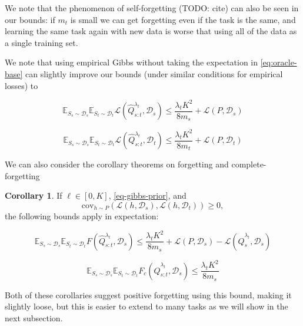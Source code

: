 \documentclass[letterpaper]{article}
\theoremstyle{definition}
\newtheorem{corollary}{Corollary}
\begin{document}
We note that the phenomenon of self-forgetting (TODO: cite) can also be seen in our bounds: if $m_t$ is small we can get forgetting even if the task is the same, and learning the same task again with new data is worse that using all of the data as a single training set.

We note that using empirical Gibbs without taking the expectation in \eqref{eq:oracle-base} can slightly improve our bounds (under similar conditions for empirical losses) to 

\begin{equation} 
\mathbb{E}_{S_s\sim \mathcal{D}_s}\mathbb{E}_{S_t\sim \mathcal{D}_t}\mathcal{L}( \hat{Q}^{\lambda_t}_{s:t},\mathcal{D}_s)\leq \frac{\lambda_t K^2}{8m_s}+\mathcal{L}(P,\mathcal{D}_s)
\end{equation}

\begin{equation} 
\mathbb{E}_{S_s\sim \mathcal{D}_s}\mathbb{E}_{S_t\sim \mathcal{D}_t}\mathcal{L}( \hat{Q}^{\lambda_t}_{s:t},\mathcal{D}_t)\leq \frac{\lambda_t K^2}{8m_t}+\mathcal{L}(P,\mathcal{D}_t) 
\end{equation}

We can also consider the corollary theorems on forgetting and complete-forgetting

\begin{corollary}
If $\ell\in[0,K]$, \eqref{eq-gibbs-prior}, and $$\mathrm{cov}_{h\sim P}\left (\mathcal{L}(h,\mathcal{D}_s), \mathcal{L}(h,\mathcal{D}_t)\right )\geq 0,$$ the following bounds apply in expectation:    

\begin{equation} 
\mathbb{E}_{S_s\sim \mathcal{D}_s}\mathbb{E}_{S_t\sim \mathcal{D}_t}F( \hat{Q}^{\lambda_t}_{s:t},\mathcal{D}_s)\leq \frac{\lambda_t K^2}{8m_s}+\mathcal{L}(P,\mathcal{D}_s)-\mathcal{L}(\hat{Q}^{\lambda_t}_{s},\mathcal{D}_s)
\end{equation}

\begin{equation} 
\mathbb{E}_{S_s\sim \mathcal{D}_s}\mathbb{E}_{S_t\sim \mathcal{D}_t}F_c( \hat{Q}^{\lambda_t}_{s:t},\mathcal{D}_s)\leq \frac{\lambda_t K^2}{8m_s}
\end{equation}
\end{corollary}

Both of these corollaries suggest positive forgetting using this bound, making it slightly loose, but this is easier to extend to many tasks as we will show in the next subsection.

\end{document}
